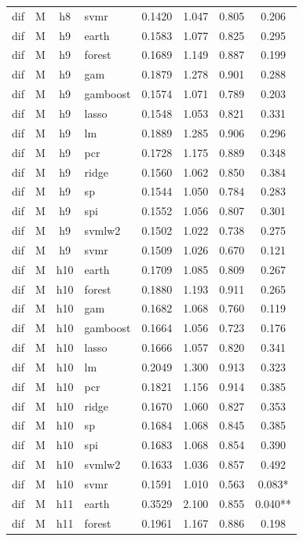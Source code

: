 \begin{ThreePartTable}
\begin{longtable}[t]{llclcccc}
dif & M & h8 & svmr & 0.1420 & 1.047 & 0.805 & 0.206\\
\addlinespace
dif & M & h9 & earth & 0.1583 & 1.077 & 0.825 & 0.295\\
dif & M & h9 & forest & 0.1689 & 1.149 & 0.887 & 0.199\\
dif & M & h9 & gam & 0.1879 & 1.278 & 0.901 & 0.288\\
dif & M & h9 & gamboost & 0.1574 & 1.071 & 0.789 & 0.203\\
dif & M & h9 & lasso & 0.1548 & 1.053 & 0.821 & 0.331\\
dif & M & h9 & lm & 0.1889 & 1.285 & 0.906 & 0.296\\
dif & M & h9 & pcr & 0.1728 & 1.175 & 0.889 & 0.348\\
dif & M & h9 & ridge & 0.1560 & 1.062 & 0.850 & 0.384\\
dif & M & h9 & sp & 0.1544 & 1.050 & 0.784 & 0.283\\
dif & M & h9 & spi & 0.1552 & 1.056 & 0.807 & 0.301\\
dif & M & h9 & svmlw2 & 0.1502 & 1.022 & 0.738 & 0.275\\
dif & M & h9 & svmr & 0.1509 & 1.026 & 0.670 & 0.121\\
\addlinespace
dif & M & h10 & earth & 0.1709 & 1.085 & 0.809 & 0.267\\
dif & M & h10 & forest & 0.1880 & 1.193 & 0.911 & 0.265\\
dif & M & h10 & gam & 0.1682 & 1.068 & 0.760 & 0.119\\
dif & M & h10 & gamboost & 0.1664 & 1.056 & 0.723 & 0.176\\
dif & M & h10 & lasso & 0.1666 & 1.057 & 0.820 & 0.341\\
dif & M & h10 & lm & 0.2049 & 1.300 & 0.913 & 0.323\\
dif & M & h10 & pcr & 0.1821 & 1.156 & 0.914 & 0.385\\
dif & M & h10 & ridge & 0.1670 & 1.060 & 0.827 & 0.353\\
dif & M & h10 & sp & 0.1684 & 1.068 & 0.845 & 0.385\\
dif & M & h10 & spi & 0.1683 & 1.068 & 0.854 & 0.390\\
dif & M & h10 & svmlw2 & 0.1633 & 1.036 & 0.857 & 0.492\\
dif & M & h10 & svmr & 0.1591 & 1.010 & 0.563 & 0.083*\\
\addlinespace
dif & M & h11 & earth & 0.3529 & 2.100 & 0.855 & 0.040**\\
dif & M & h11 & forest & 0.1961 & 1.167 & 0.886 & 0.198\\

\end{longtable}
\end{ThreePartTable}
